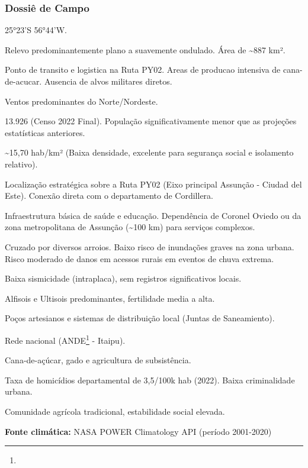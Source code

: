 \subsubsection{Dossiê de Campo}
\begin{description}[style=nextline,leftmargin=0.5cm,font=\bfseries]
\item[Coordenadas]  25°23'S 56°44'W.
\item[Topografia]  Relevo predominantemente plano a suavemente ondulado. Área de \textasciitilde 887 km².
\item[Alvos Estrategicos]  Ponto de transito e logistica na Ruta PY02. Areas de producao intensiva de cana-de-acucar. Ausencia de alvos militares diretos.
\item[Fallout]  Ventos predominantes do Norte/\allowbreak Nordeste.
\item[Populacao]  13.926 (Censo 2022 Final). População significativamente menor que as projeções estatísticas anteriores.
\item[Densidade]  \textasciitilde 15,70 hab/\allowbreak km² (Baixa densidade, excelente para segurança social e isolamento relativo).
\item[Vias de Acesso]  Localização estratégica sobre a Ruta PY02 (Eixo principal Assunção - Ciudad del Este). Conexão direta com o departamento de Cordillera.
\item[Servicos]  Infraestrutura básica de saúde e educação. Dependência de Coronel Oviedo ou da zona metropolitana de Assunção (\textasciitilde 100 km) para serviços complexos.
\item[Hidrologia]  Cruzado por diversos arroios. Baixo risco de inundações graves na zona urbana. Risco moderado de danos em acessos rurais em eventos de chuva extrema.
\item[Sismicidade]  Baixa sismicidade (intraplaca), sem registros significativos locais.
\item[Solo]  Alfisois e Ultisois predominantes, fertilidade media a alta.
\item[Agua]  Poços artesianos e sistemas de distribuição local (Juntas de Saneamiento).
\item[Energia]  Rede nacional (ANDE\footnote{\fineANDE} - Itaipu).
\item[Producao]  Cana-de-açúcar, gado e agricultura de subsistência.
\item[Seguranca]  Taxa de homicídios departamental de 3,5/\allowbreak 100k hab (2022). Baixa criminalidade urbana.
\item[Clima Social]  Comunidade agrícola tradicional, estabilidade social elevada.
\end{description}
\textbf{Fonte climática:} NASA POWER Climatology API (período 2001-2020)

